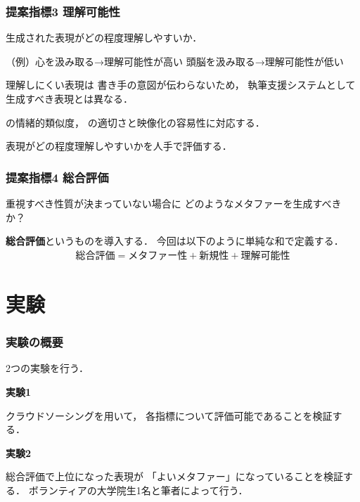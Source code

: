 \documentclass[12pt,usepdftitle=false]{beamer}
\begin{document}
\begin{frame}
    \frametitle{提案指標3 理解可能性}
    生成された表現がどの程度理解しやすいか．

    （例）心を汲み取る→理解可能性が高い\newline
     \phantom{（例）}\hspace{0.5\zw}頭脳を汲み取る→理解可能性が低い

     \bigskip

     理解しにくい表現は
     書き手の意図が伝わらないため，
     執筆支援システムとして
     生成すべき表現とは異なる．

     \bigskip

    \citet{jakitada2001}の情緒的類似度，
    \citet{abe2006}の適切さと映像化の容易性に対応する．

    \bigskip

    表現がどの程度理解しやすいかを人手で評価する．

\end{frame}

\begin{frame}
    \frametitle{提案指標4 総合評価}

    重視すべき性質が決まっていない場合に
    どのようなメタファーを生成すべきか？

    \bigskip

    \textbf{総合評価}というものを導入する．
    今回は以下のように単純な和で定義する．
    \begin{align*}
        \text{総合評価}=\text{メタファー性}+\text{新規性}+\text{理解可能性}
    \end{align*}

\end{frame}

\section{実験}
\begin{frame}
    \frametitle{実験の概要}

    2つの実験を行う．

    \bigskip

    \textbf{実験1}

    クラウドソーシングを用いて，
    各指標について評価可能であることを検証する．

    \bigskip

    \textbf{実験2}

    総合評価で上位になった表現が
    「よいメタファー」になっていることを検証する．
    ボランティアの大学院生1名と筆者によって行う．

\end{frame}
\end{document}
